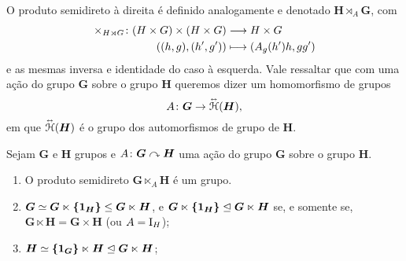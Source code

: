 O produto semidireto à direita é definido analogamente e denotado $\bm H \rtimes_A \bm G$, com
	\begin{align*}
		{\times_{H \rtimes G}}\colon {(H \times G) \times (H \times G)} &\longrightarrow {H \times G} \\{((h,g),(h',g'))} &\longmapsto (A_g(h')h,gg')
	\end{align*}
e as mesmas inversa e identidade do caso à esquerda. Vale ressaltar que com uma ação do grupo $\bm G$ sobre o grupo $\bm H$ queremos dizer um homomorfismo de grupos
	\begin{equation*}
		A\colon \bm G \to \accentset{\leftrightarrow}{\mathcal{H}}(\bm H),
	\end{equation*}
em que $\accentset{\leftrightarrow}{\mathcal{H}}(\bm H)$ é o grupo dos automorfismos de grupo de $\bm H$.


\begin{exercise}
Sejam $\bm G$ e $\bm H$ grupos e $A\colon \bm G \curvearrowright \bm H$ uma ação do grupo $\bm G$ sobre o grupo $\bm H$.
	\begin{enumerate}
		\item O produto semidireto $\bm G \ltimes_A \bm H$ é um grupo.

		\item $\bm G \simeq \bm G \ltimes \bm{\{1_H\}} \leq \bm G \ltimes \bm H$, e $\bm G \ltimes \bm{\{1_H\}} \mathrel{\unlhd} \bm G \ltimes \bm H$ se, e somente se, $\bm G \ltimes \bm H = \bm G \times \bm H$ (ou $A=\mathrm{I}_H$);

		\item $\bm H \simeq \bm{\{1_G\}} \ltimes \bm H \mathrel{\unlhd} \bm G \ltimes \bm H$;
	\end{enumerate}
\end{exercise}

